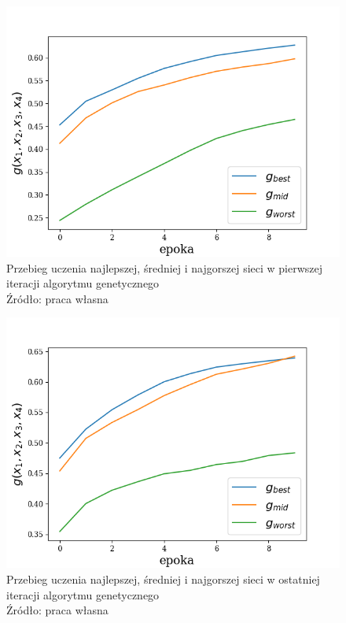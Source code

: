 \begin{figure}[h!tb]
	 \centering
	 \includegraphics[width = 0.85\linewidth]{img/iter_learn_first}
	 \caption{Przebieg uczenia najlepszej, średniej i najgorszej sieci w pierwszej iteracji algorytmu genetycznego\\
              Źródło: praca własna}
	 \label{fig:iter_learn_first}
\end{figure}

\begin{figure}[h!tb]
	 \centering
	 \includegraphics[width = 0.85\linewidth]{img/iter_learn_last}
	 \caption{Przebieg uczenia najlepszej, średniej i najgorszej sieci w ostatniej iteracji algorytmu genetycznego\\
              Źródło: praca własna}
	 \label{fig:iter_learn_last}
\end{figure}

